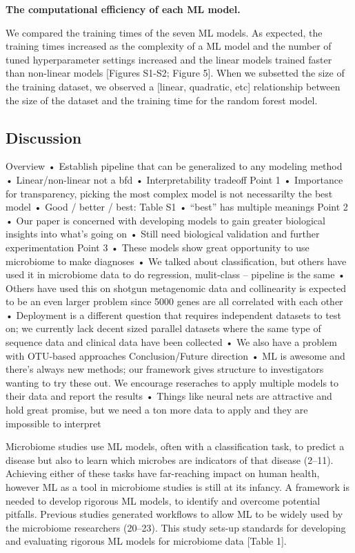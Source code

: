 \documentclass[11pt,]{article}
\begin{document}
\textbf{The computational efficiency of each ML model.}

We compared the training times of the seven ML models. As expected, the
training times increased as the complexity of a ML model and the number
of tuned hyperparameter settings increased and the linear models trained
faster than non-linear models {[}Figures S1-S2; Figure 5{]}. When we
subsetted the size of the training dataset, we observed a {[}linear,
quadratic, etc{]} relationship between the size of the dataset and the
training time for the random forest model.

\subsection{Discussion}\label{discussion}

Overview • Establish pipeline that can be generalized to any modeling
method • Linear/non-linear not a bfd • Interpretability tradeoff Point 1
• Importance for transparency, picking the most complex model is not
necessarilty the best model • Good / better / best: Table S1 • ``best''
has multiple meanings Point 2 • Our paper is concerned with developing
models to gain greater biological insights into what's going on • Still
need biological validation and further experimentation Point 3 • These
models show great opportunity to use microbiome to make diagnoses • We
talked about classification, but others have used it in microbiome data
to do regression, mulit-class -- pipeline is the same • Others have used
this on shotgun metagenomic data and collinearity is expected to be an
even larger problem since 5000 genes are all correlated with each other
• Deployment is a different question that requires independent datasets
to test on; we currently lack decent sized parallel datasets where the
same type of sequence data and clinical data have been collected • We
also have a problem with OTU-based approaches Conclusion/Future
direction • ML is awesome and there's always new methods; our framework
gives structure to investigators wanting to try these out. We encourage
reseraches to apply multiple models to their data and report the results
• Things like neural nets are attractive and hold great promise, but we
need a ton more data to apply and they are impossible to interpret

Microbiome studies use ML models, often with a classification task, to
predict a disease but also to learn which microbes are indicators of
that disease (2--11). Achieving either of these tasks have far-reaching
impact on human health, however ML as a tool in microbiome studies is
still at its infancy. A framework is needed to develop rigorous ML
models, to identify and overcome potential pitfalls. Previous studies
generated workflows to allow ML to be widely used by the microbiome
researchers (20--23). This study sets-up standards for developing and
evaluating rigorous ML models for microbiome data {[}Table 1{]}.
\end{document}
